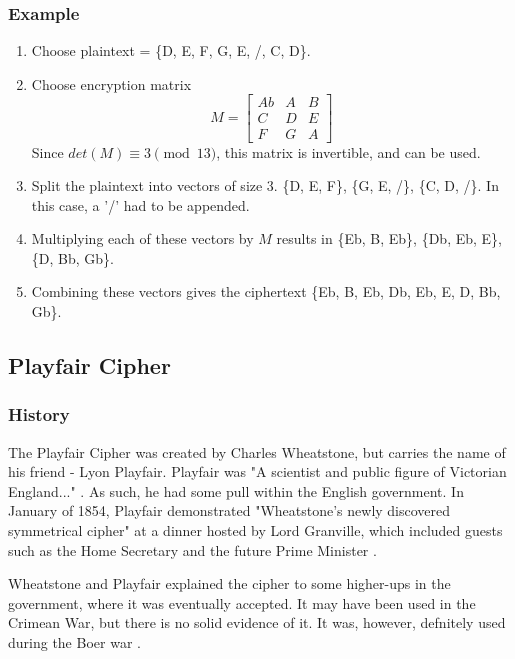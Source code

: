 \documentclass[14pt]{article}
\begin{document}
    	\subsubsection{Example}
            \begin{enumerate}
                \item Choose plaintext = \{D, E, F, G, E, /, C, D\}.
                \item Choose encryption matrix
            	\[
                M =
        		\begin{bmatrix}
        			Ab & A & B \\
        			C  & D & E \\
        			F  & G & A
        		\end{bmatrix}
            	\]
                Since $det(M) \equiv 3 \pmod{13}$, this matrix is invertible, and can be used.
                \item Split the plaintext into vectors of size 3. \{D, E, F\}, \{G, E, /\}, \{C, D, /\}. In this case, a '/' had to be appended.
                \item Multiplying each of these vectors by $M$ results in \{Eb, B, Eb\}, \{Db, Eb, E\}, \{D, Bb, Gb\}.
                \item Combining these vectors gives the ciphertext \{Eb, B, Eb, Db, Eb, E, D, Bb, Gb\}.
            \end{enumerate}

	\subsection{Playfair Cipher}
    	\subsubsection{History}
        The Playfair Cipher was created by Charles Wheatstone, but carries the name of his friend - Lyon Playfair. Playfair was "A scientist and public figure of Victorian England..." \cite{Kahn}. As such, he had some pull within the English government. In January of 1854, Playfair demonstrated "Wheatstone's newly discovered symmetrical cipher" at a dinner hosted by Lord Granville, which included guests such as the Home Secretary and the future Prime Minister \cite{Kahn}.
        
        Wheatstone and Playfair explained the cipher to some higher-ups in the government, where it was eventually accepted. It may have been used in the Crimean War, but there is no solid evidence of it. It was, however, defnitely used during the Boer war \cite{Kahn}.
    
\end{document}
